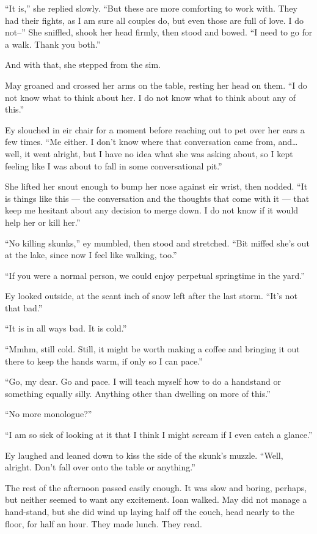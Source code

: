 ``It is,'' she replied slowly. ``But these are more comforting to work with. They had their fights, as I am sure all couples do, but even those are full of love. I do not--'' She sniffled, shook her head firmly, then stood and bowed. ``I need to go for a walk. Thank you both.''

And with that, she stepped from the sim.

May groaned and crossed her arms on the table, resting her head on them. ``I do not know what to think about her. I do not know what to think about any of this.''

Ey slouched in eir chair for a moment before reaching out to pet over her ears a few times. ``Me either. I don't know where that conversation came from, and\ldots well, it went alright, but I have no idea what she was asking about, so I kept feeling like I was about to fall in some conversational pit.''

She lifted her snout enough to bump her nose against eir wrist, then nodded. ``It is things like this — the conversation and the thoughts that come with it — that keep me hesitant about any decision to merge down. I do not know if it would help her or kill her.''

``No killing skunks,'' ey mumbled, then stood and stretched. ``Bit miffed she's out at the lake, since now I feel like walking, too.''

``If you were a normal person, we could enjoy perpetual springtime in the yard.''

Ey looked outside, at the scant inch of snow left after the last storm. ``It's not that bad.''

``It is in all ways bad. It is cold.''

``Mmhm, still cold. Still, it might be worth making a coffee and bringing it out there to keep the hands warm, if only so I can pace.''

``Go, my dear. Go and pace. I will teach myself how to do a handstand or something equally silly. Anything other than dwelling on more of this.''

``No more monologue?''

``I am so sick of looking at it that I think I might scream if I even catch a glance.''

Ey laughed and leaned down to kiss the side of the skunk's muzzle. ``Well, alright. Don't fall over onto the table or anything.''

The rest of the afternoon passed easily enough. It was slow and boring, perhaps, but neither seemed to want any excitement. Ioan walked. May did not manage a hand-stand, but she did wind up laying half off the couch, head nearly to the floor, for half an hour. They made lunch. They read.

